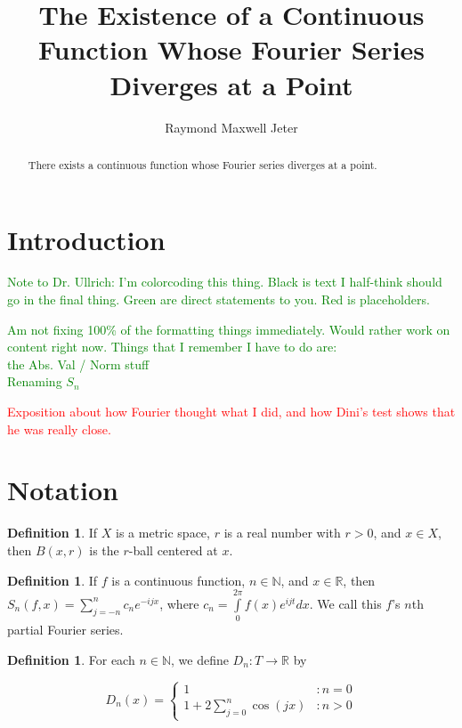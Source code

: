 \documentclass{amsart}
\newcommand{\N}{\mathbb{N}}
\newcommand{\R}{\mathbb{R}}
\theoremstyle{definition}
\newtheorem{definition}[thm]{Definition}
\begin{document}
\title{The Existence of a Continuous Function Whose Fourier Series Diverges at a Point}
\author{Raymond Maxwell Jeter}

\begin{abstract}
There exists a continuous function whose Fourier series diverges at a point.
\end{abstract}

\maketitle

\section{Introduction}

\textcolor{green}{Note to Dr. Ullrich: I'm colorcoding this thing. Black is text I half-think should go in the final thing. Green are direct statements to you. Red is placeholders.}

\textcolor{green}{Am not fixing 100\% of the formatting things immediately. Would rather work on content right now. Things that I remember I have to do are:\\ 
the Abs. Val / Norm stuff\\
Renaming $S_n$ \\
}

\textcolor{red}{Exposition about how Fourier thought what I did, and how Dini's test shows that he was really close.}

\section{Notation}

\begin{definition}
If $X$ is a metric space, $r$ is a real number with $r>0$, and $x \in X$, then $B(x,r)$ is the $r$-ball centered at $x$.
\end{definition}

\begin{definition}
If $f$ is a continuous function, $n \in \N$, and $x \in \R$, then $S_n(f,x) = \sum\limits_{j=-n}^n c_n e^{-ijx}$, where $c_n = \int\limits_0^{2\pi} f(x)e^{ijt} dx$. We call this $f$'s $n$th partial Fourier series.
\end{definition}

\begin{definition}
For each $n \in \N$, we define $D_n: T \to \R$ by


\begin{displaymath}
   D_n(x) = \left\{
     \begin{array}{lr}
       1 & : n=0\\
       1+ 2\sum\limits_{j=0}^n \cos(j x) & : n > 0
     \end{array}
   \right.
\end{displaymath} 
\end{definition}
\end{document}
